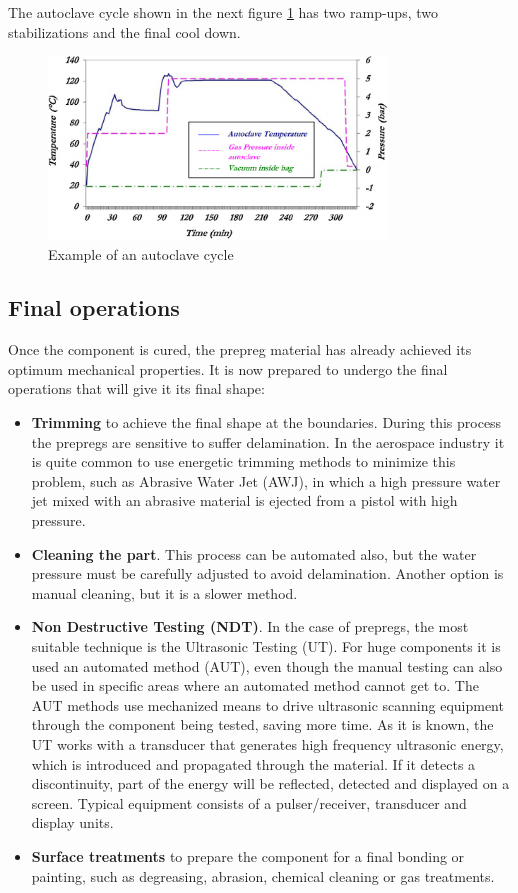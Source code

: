 The autoclave cycle shown in the next figure \ref{fig:autoclave_cycle} has two ramp-ups, two stabilizations and the final cool down.

\begin{figure}[h]
	\centering
	\includegraphics[width=0.8\textwidth]{img/autoclave_cycle.png}
	\caption{Example of an autoclave cycle}
	\label{fig:autoclave_cycle}
\end{figure}

\subsection{Final operations}

Once the component is cured, the prepreg material has already achieved its optimum mechanical properties. It is now prepared to undergo the final operations that will give it its final shape:

\begin{itemize}
\item \textbf{Trimming} to achieve the final shape at the boundaries. During this process the prepregs are sensitive to suffer delamination. In the aerospace industry it is quite common to use energetic trimming methods to minimize this problem, such as Abrasive Water Jet (AWJ)\cite{Alberdi2013}, in which a high pressure water jet mixed with an abrasive material is ejected from a pistol with high pressure.
\item \textbf{Cleaning the part}. This process can be automated also, but the water pressure must be carefully adjusted to avoid delamination. Another option is manual cleaning, but it is a slower method.
\item \textbf{Non Destructive Testing (NDT)}. In the case of prepregs, the most suitable technique is the Ultrasonic Testing (UT). For huge components it is used an automated method (AUT), even though the manual testing can also be used in specific areas where an automated method cannot get to. The AUT methods use mechanized means to drive ultrasonic scanning equipment through the component being tested, saving more time. As it is known, the UT works with a transducer that generates high frequency ultrasonic energy, which is introduced and propagated through the material. If it detects a discontinuity, part of the energy will be reflected, detected and displayed on a screen. Typical equipment consists of a pulser/receiver, transducer and display units.
\item \textbf{Surface treatments} to prepare the component for a final bonding or painting, such as degreasing, abrasion, chemical cleaning or gas treatments.
\end{itemize}

